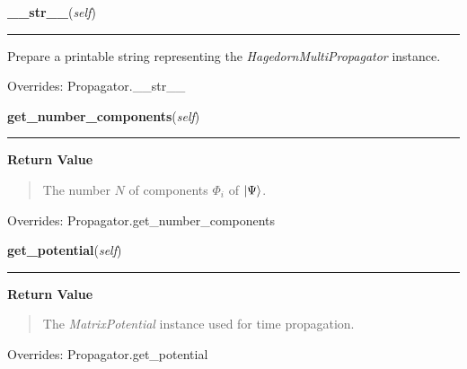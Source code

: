 \hspace{.8\funcindent}\begin{boxedminipage}{\funcwidth}

    \raggedright \textbf{\_\_str\_\_}(\textit{self})

    \vspace{-1.5ex}

    \rule{\textwidth}{0.5\fboxrule}
\setlength{\parskip}{2ex}
    Prepare a printable string representing the
    \textit{HagedornMultiPropagator} instance.

\setlength{\parskip}{1ex}

      Overrides: Propagator.\_\_str\_\_

    \end{boxedminipage}

    \vspace{0.5ex}

\hspace{.8\funcindent}\begin{boxedminipage}{\funcwidth}

    \raggedright \textbf{get\_number\_components}(\textit{self})

    \vspace{-1.5ex}

    \rule{\textwidth}{0.5\fboxrule}
\setlength{\parskip}{2ex}
\setlength{\parskip}{1ex}
      \textbf{Return Value}
    \vspace{-1ex}

      \begin{quote}
      The number $N$ of components $\Phi_i$ of
      $\Ket{\Psi}$.

      \end{quote}

      Overrides: Propagator.get\_number\_components

    \end{boxedminipage}

    \vspace{0.5ex}

\hspace{.8\funcindent}\begin{boxedminipage}{\funcwidth}

    \raggedright \textbf{get\_potential}(\textit{self})

    \vspace{-1.5ex}

    \rule{\textwidth}{0.5\fboxrule}
\setlength{\parskip}{2ex}
\setlength{\parskip}{1ex}
      \textbf{Return Value}
    \vspace{-1ex}

      \begin{quote}
      The \textit{MatrixPotential} instance used for time propagation.

      \end{quote}

      Overrides: Propagator.get\_potential

    \end{boxedminipage}

